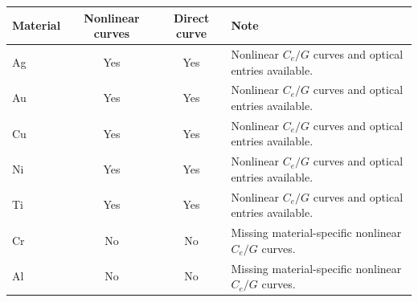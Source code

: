 \begin{tabular}{lccp{}}
\toprule
Material & Nonlinear curves & Direct curve & Note \\
\midrule
Ag & Yes & Yes & Nonlinear $C_e/G$ curves and optical entries available. \\
Au & Yes & Yes & Nonlinear $C_e/G$ curves and optical entries available. \\
Cu & Yes & Yes & Nonlinear $C_e/G$ curves and optical entries available. \\
Ni & Yes & Yes & Nonlinear $C_e/G$ curves and optical entries available. \\
Ti & Yes & Yes & Nonlinear $C_e/G$ curves and optical entries available. \\
Cr & No & No & Missing material-specific nonlinear $C_e/G$ curves. \\
Al & No & No & Missing material-specific nonlinear $C_e/G$ curves. \\
\bottomrule
\end{tabular}
